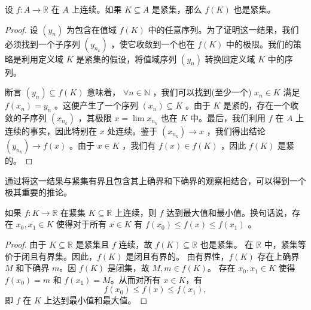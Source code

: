 \begin{Thm}[紧集的保持性]
  \label{thm:4.4.2}
  设 \(f : A \rightarrow  \mathbb{R}\) 在 \(A\) 上连续。如果 \(K \subseteq  A\) 是紧集，那么 \(f\left( K\right)\) 也是紧集。
\end{Thm}


\begin{proof}
设 \(\left( {y}_{n}\right)\) 为包含在值域 \(f\left( K\right)\) 中的任意序列。为了证明这一结果，我们必须找到一个子序列 \(\left( {y}_{{n}_{k}}\right)\) ，使它收敛到一个也在 \(f\left( K\right)\) 中的极限。我们的策略是利用定义域 \(K\) 是紧集的假设，将值域序列 \(\left( {y}_{n}\right)\) 转换回定义域 \(K\) 中的序列。

断言 \(\left( {y}_{n}\right)  \subseteq  f\left( K\right)\) 意味着， \(\forall n \in  \mathbb{N}\) ，我们可以找到(至少一个) \({x}_{n} \in  K\) 满足 \(f\left( {x}_{n}\right)  = {y}_{n}\) 。这便产生了一个序列 \(\left( {x}_{n}\right)  \subseteq  K\) 。由于 \(K\) 是紧的，存在一个收敛的子序列 \(\left( {x}_{{n}_{k}}\right)\) ，其极限 \(x = \lim {x}_{{n}_{k}}\) 也在 \(K\) 中。最后，我们利用 \(f\) 在 \(A\) 上连续的事实，因此特别在 \(x\) 处连续。鉴于 \(\left( {x}_{{n}_{k}}\right)  \rightarrow  x\) ，我们得出结论 \(\left( {y}_{{n}_{k}}\right)  \rightarrow  f\left( x\right)\) 。由于 \(x \in  K\) ，我们有 \(f\left( x\right)  \in  f\left( K\right)\) ，因此 \(f\left( K\right)\) 是紧的。  
\end{proof}


通过将这一结果与紧集有界且包含其上确界和下确界的观察相结合，可以得到一个极其重要的推论。

\begin{Thm}[极值定理]
  \label{thm:4.4.3}
  如果 \(f : K \rightarrow  \mathbb{R}\) 在紧集 \(K \subseteq  \mathbb{R}\) 上连续，则 \(f\) 达到最大值和最小值。换句话说，存在 \({x}_{0},{x}_{1} \in  K\) 使得对于所有 \(x \in  K\) 有 \(f\left( {x}_{0}\right)  \leq  f\left( x\right)  \leq  f\left( {x}_{1}\right)\) 。
\end{Thm}

\begin{proof}
  由于 \( K \subseteq \mathbb{R} \) 是紧集且 \( f \) 连续，故 \( f(K) \subseteq \mathbb{R} \) 也是紧集。  
在 \(\mathbb{R}\) 中，紧集等价于闭且有界集。因此，\( f(K) \) 是闭且有界的。  
由有界性，\( f(K) \) 存在上确界 \( M \) 和下确界 \( m \)。因 \( f(K) \) 是闭集，故 \( M, m \in f(K) \)。  
存在 \( x_0, x_1 \in K \) 使得 \( f(x_0) = m \) 和 \( f(x_1) = M \)。从而对所有 \( x \in K \)，有  
   \[
   f(x_0) \leq f(x) \leq f(x_1),
   \]
   即 \( f \) 在 \( K \) 上达到最小值和最大值。
\end{proof}



